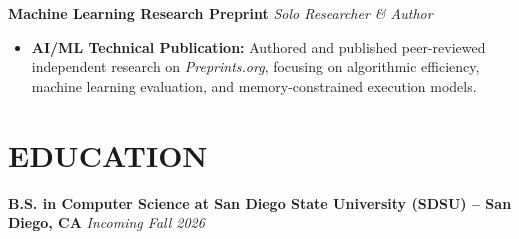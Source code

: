 \documentclass[letterpaper,11pt]{article}
\begin{document}
\vspace{4pt}

\noindent\textbf{Machine Learning Research Preprint} \hfill \textit{Solo Researcher \& Author}
\begin{itemize}[noitemsep, topsep=2pt, leftmargin=1.2em]
    \item \textbf{AI/ML Technical Publication:} Authored and published peer-reviewed independent research on \textit{Preprints.org}, focusing on algorithmic efficiency, machine learning evaluation, and memory-constrained execution models.
\end{itemize}

\section{EDUCATION}

\noindent\textbf{B.S. in Computer Science at San Diego State University (SDSU) -- San Diego, CA } \hfill \textit{Incoming Fall 2026}\\
\begin{itemize}[noitemsep, topsep=1pt, leftmargin=1.2em]
\end{itemize}
\end{document}
